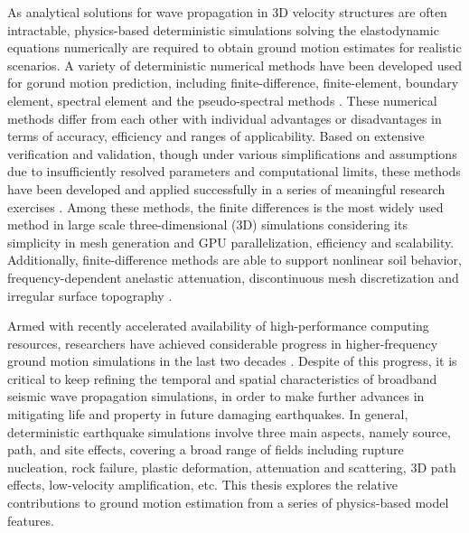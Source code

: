 As analytical solutions for wave propagation in 3D velocity structures are often intractable, physics-based deterministic simulations solving the elastodynamic equations numerically are required to obtain ground motion estimates for realistic scenarios. A variety of deterministic numerical methods have been developed used for gorund motion prediction, including finite-difference, finite-element, boundary element, spectral element and the pseudo-spectral methods . These numerical methods differ from each other with individual advantages or disadvantages in terms of accuracy, efficiency and ranges of applicability.  Based on extensive verification and validation, though under various simplifications and assumptions due to insufficiently resolved parameters and computational limits, these methods have been developed and applied successfully in a series of meaningful research exercises \citep[e.g., ShakeOut, PetaShake, M9 Cascadia; for more details readers are referred to ][]{cuiPetascaleEarthquakeSimulations2009,cuiTeraShakeComputationalPlatform2009,olsen2009shakeout,marafiImpactsSimulatedM92019}. Among these methods, the finite differences is the most widely used method in large scale three-dimensional (3D) simulations considering its simplicity in mesh generation and GPU parallelization, efficiency and scalability. Additionally, finite-difference methods are able to support nonlinear soil behavior, frequency-dependent anelastic attenuation, discontinuous mesh discretization and irregular surface topography .

Armed with recently accelerated availability of high-performance computing resources, researchers have achieved considerable progress in higher-frequency ground motion simulations in the last two decades \citep{gravesBroadbandSimulationsSouthern2008,olsen2009shakeout,bielakShakeOutEarthquakeScenario2010,roten3DSimulationsEarthquakes2012, savranGroundMotionSimulation2019,withersGroundMotionIntraevent2019}. Despite of this progress, it is critical to keep refining the temporal and spatial characteristics of broadband seismic wave propagation simulations, in order to make further advances in mitigating life and property in future damaging earthquakes. In general, deterministic earthquake simulations involve three main aspects, namely source, path, and site effects, covering a broad range of fields including rupture nucleation, rock failure, plastic deformation, attenuation and scattering, 3D path effects, low-velocity amplification, etc. This thesis explores the relative contributions to ground motion estimation from a series of physics-based model features.


